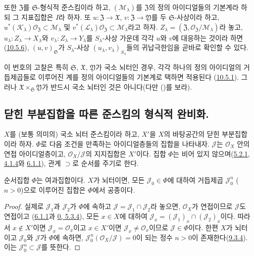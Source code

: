 \begin{env}[10.7.4]
또한 $\mathfrak{Z}$를 $\mathfrak{S}$-형식적 준스킴이라 하고,
$(\mathscr{M}_\lambda)$를 $\mathfrak{Z}$의 정의 아이디얼들의 기본계라
하되 그 지표집합은 $I$라 하자. 또
$u:\mathfrak{Z}\to\mathfrak{X}$,
$v:\mathfrak{Z}\to\mathfrak{Y}$를 두 $\mathfrak{S}$-사상이라 하고,
$u^*(\mathscr{K}_\lambda)\mathscr{O}_{\mathfrak{Z}}
\subset\mathscr{M}_\lambda$ 및
$v^*(\mathscr{L}_\lambda)\mathscr{O}_{\mathfrak{Z}}
\subset\mathscr{M}_\lambda$라고 하자.
$Z_\lambda=(\mathfrak{Z},
\mathscr{O}_{\mathfrak{Z}}/\mathscr{M}_\lambda)$라 놓고,
$u_\lambda:Z_\lambda\to X_\lambda$와
$v_\lambda:Z_\lambda\to Y_\lambda$를 $S_\lambda$-사상 가운데 각각
$u$와 $v$에 대응하는 것이라 하면
(\hyperref[I.10.5.6-ko]{10.5.6}), $(u,v)_{\mathfrak{S}}$가
$S_\lambda$-사상 $(u_\lambda,v_\lambda)_{S_\lambda}$들의
귀납극한임을 곧바로 확인할 수 있다.

이 번호의 고찰은 특히 $\mathfrak{S}$, $\mathfrak{X}$,
$\mathfrak{Y}$가 국소 뇌터인 경우, 각각 하나의 정의 아이디얼의
거듭제곱들로 이루어진 계를 정의 아이디얼들의 기본계로 택하면 적용된다
(\hyperref[I.10.5.1-ko]{10.5.1}). 그러나
$\mathfrak{X}\times_{\mathfrak{S}}\mathfrak{Y}$가 반드시 국소 뇌터인
것은 아니다(다만 ()를 보라).
\end{env}

\subsection{닫힌 부분집합을 따른 준스킴의 형식적 완비화.}
\label{subsection:I.10.8-ko}

\begin{env}[10.8.1]
\label{I.10.8.1-ko}
$X$를 (보통 의미의) 국소 뇌터 준스킴이라 하고, $X'$을 $X$의
바탕공간의 닫힌 부분집합이라 하자. $\Phi$로 다음 조건을 만족하는
아이디얼층들의 집합을 나타내자. $\mathscr{J}$는
$\mathscr{O}_X$ 안의 연접 아이디얼층이고, $\mathscr{O}_X/\mathscr{J}$의
지지집합은 $X'$이다. 집합 $\Phi$는 비어 있지
않으며(\hyperref[I.5.2.1-ko]{5.2.1},
\hyperref[I.4.1.4-ko]{4.1.4}와
\hyperref[I.6.1.1-ko]{6.1.1}), 관계 $\supset$로 순서를 주기로 한다.
\end{env}

\begin{lemma}[10.8.2]
\label{I.10.8.2-ko}
순서집합 $\Phi$는 여과집합이다. $X$가 뇌터이면, 모든
$\mathscr{J}_0\in\Phi$에 대하여 거듭제곱 $\mathscr{J}_0^n$
($n>0$)으로 이루어진 집합은 $\Phi$에서 공종이다.
\end{lemma}

\begin{proof}
실제로 $\mathscr{J}_1$과 $\mathscr{J}_2$가 $\Phi$에 속하고
$\mathscr{J}=\mathscr{J}_1\cap\mathscr{J}_2$라 놓으면,
$\mathscr{O}_X$가 연접이므로 $\mathscr{J}$도 연접이고
(\hyperref[I.6.1.1-ko]{6.1.1}과
\hyperref[0.5.3.4-ko]{0, 5.3.4}), 모든 $x\in X$에 대하여
$\mathscr{J}_x=(\mathscr{J}_1)_x\cap(\mathscr{J}_2)_x$이다. 따라서
$x\notin X'$이면 $\mathscr{J}_x=\mathscr{O}_x$이고
$x\in X'$이면 $\mathscr{J}_x\neq\mathscr{O}_x$이므로
$\mathscr{J}\in\Phi$이다. 한편 $X$가 뇌터이고
$\mathscr{J}_0$와 $\mathscr{J}$가 $\Phi$에 속하면,
$\mathscr{J}_0^n(\mathscr{O}_X/\mathscr{J})=0$이 되는 정수
$n>0$이 존재한다(\hyperref[I.9.3.4-ko]{9.3.4}). 이는
$\mathscr{J}_0^n\subset\mathscr{J}$를 뜻한다.
\end{proof}

